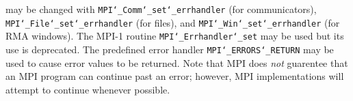 may be changed with {\tt MPI{\tt \char`\_}Comm{\tt \char`\_}set{\tt \char`\_}errhandler} (for communicators),
{\tt MPI{\tt \char`\_}File{\tt \char`\_}set{\tt \char`\_}errhandler} (for files), and {\tt MPI{\tt \char`\_}Win{\tt \char`\_}set{\tt \char`\_}errhandler} (for
RMA windows).  The MPI-1 routine {\tt MPI{\tt \char`\_}Errhandler{\tt \char`\_}set} may be used but
its use is deprecated.  The predefined error handler
{\tt MPI{\tt \char`\_}ERRORS{\tt \char`\_}RETURN} may be used to cause error values to be returned.
Note that MPI does {\em not} guarentee that an MPI program can continue past
an error; however, MPI implementations will attempt to continue whenever
possible.
\par
{}
\endmanpage
